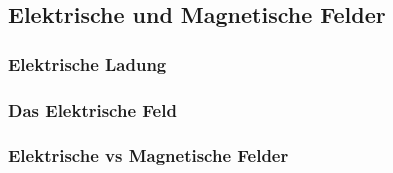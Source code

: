 \subsection{Elektrische und Magnetische Felder}

\subsubsection{Elektrische Ladung}

\subsubsection{Das Elektrische Feld}

\subsubsection{Elektrische vs Magnetische Felder}







